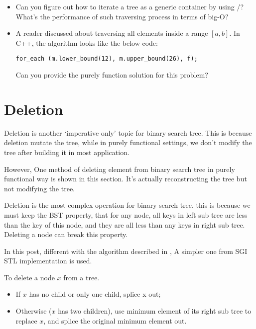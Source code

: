 \documentclass{article}
\begin{document}
\begin{Exercise}

\begin{itemize}
\item Can you figure out how to iterate a tree as a generic container
by using /? What's the performance of such traversing
process in terms of big-O?

\item A reader discussed about traversing all elements inside a
range $[a, b]$. In C++, the algorithm looks like the below code:

\texttt{for\_each (m.lower\_bound(12), m.upper\_bound(26), f);}

Can you provide the purely function solution for this problem?
\end{itemize}

\end{Exercise}

\section{Deletion}
Deletion is another `imperative only' topic for binary search tree.
This is because deletion mutate the tree, while in purely functional
settings, we don't modify the tree after building it in most
application.

However, One method of deleting element from binary search
tree in purely functional way is shown in this section. It's actually
reconstructing the tree but not modifying the tree.

Deletion is the most complex operation for binary search tree.
this is because we must keep the BST property, that for any node,
all keys in left sub tree are less than the key of this node, and
they are all less than any keys in right sub tree. Deleting a node
can break this property.

In this post, different with the algorithm described in \cite{CLRS},
A simpler one from SGI STL implementation is used.\cite{sgi-stl}

To delete a node $x$ from a tree.
\begin{itemize}
\item If $x$ has no child or only one child, splice x out;
\item Otherwise ($x$ has two children), use minimum element of its right sub tree to replace $x$, and splice the original minimum element out.
\end{itemize}
\end{document}
